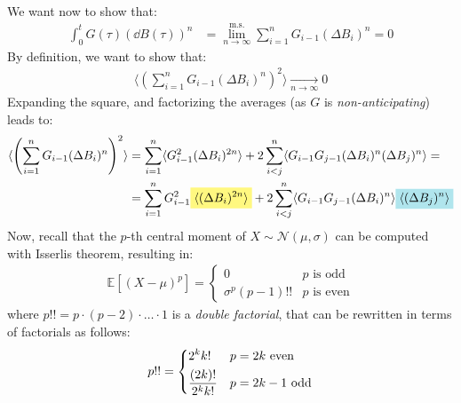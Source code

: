 \documentclass[../template.tex]{subfiles}
\begin{document}
\begin{example}
    We want now to show that:
    \begin{align*}
        \int_0^t G(\tau) (\dd{B}(\tau))^n &= \lim_{n \to\infty }^{\mathrm{m.s.}} \sum_{i=1}^n G_{i-1} (\Delta B_i)^n = 0  
    \end{align*}
    By definition, we want to show that:
    \begin{align*}
        \langle \left(\sum_{i=1}^n G_{i-1} (\Delta B_i)^n\right)^2 \rangle  \xrightarrow[n \to \infty]{}  0
    \end{align*}
    Expanding the square, and factorizing the averages (as $G$ is \textit{non-anticipating}) leads to:
    \begin{align} \nonumber
        \langle \left(\sum_{i=1}^n G_{i-1} (\Delta B_i)^n\right)^2  \rangle &= \sum_{i=1}^n \langle G_{i-1}^2 (\Delta B_i)^{2n} \rangle + 2 \sum_{i< j}^n \langle G_{i-1} G_{j-1} (\Delta B_i)^n (\Delta B_j)^n \rangle = \\
        &= \sum_{i=1}^n G_{i-1}^2 \hlc{Yellow}{\langle (\Delta B_i)^{2n} \rangle} + 2 \sum_{i<j}^n \langle G_{i-1} G_{j-1} (\Delta B_i)^n \rangle\hlc{SkyBlue}{ \langle (\Delta B_j)^n \rangle}
        \label{eqn:lim1}
    \end{align}
    Now, recall that the $p$-th central moment of $X \sim \mathcal{N}(\mu, \sigma)$ can be computed with Isserlis theorem, resulting in:
    \begin{align*}
        \mathbb{E}[(X-\mu)^p] = \begin{cases}
            0 & p \text{ is odd}\\
            \sigma^p (p-1)!! & p \text{ is even}
        \end{cases}
    \end{align*}
    where $p!! = p \cdot (p-2) \cdot \dots \cdot 1$ is a \textit{double factorial}, that can be rewritten in terms of factorials as follows:
    \begin{align}
        p!! = \begin{dcases}
            2^k k! & \text{$p = 2k$ even}\\
            \frac{(2k)!}{2^k k!} & \text{$p = 2k-1$ odd}  
        \end{dcases} \label{eqn:double-factorial}
    \end{align}


\end{example}
\end{document}
